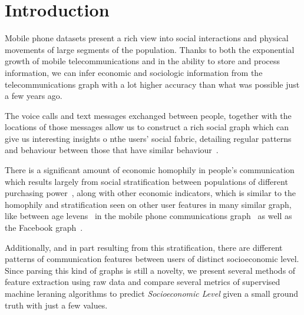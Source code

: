 \section{Introduction}

Mobile phone datasets present a rich view into social interactions and physical movements of large segments of the population. Thanks to both the exponential growth of mobile telecommunications and in the ability to store and process information, we can infer economic and sociologic information from the telecommunications graph with a lot higher accuracy than what was possible just a few years ago.

The voice calls and text messages exchanged between people, together with the locations of those messages allow us to construct a rich social graph which can give us interesting insights o nthe users' social fabric, detailing regular patterns and behaviour between those that have similar behaviour~\cite{gonzalez2008understanding, ponieman2013human, sarraute2015city}.

There is a significant amount of economic homophily in people's communication~\cite{fixmanasonam2016} which results largely from social stratification between populations of different purchasing power~\cite{leo2015socioeconomic}, along with other economic indicators, which is similar to the homophily and stratification seen on other user features in many similar graph, like between age levens~\cite{mcpherson2001birds} in the mobile phone communications graph~\cite{sarraute2014} as well as the Facebook graph~\cite{ugander2011anatomy}.

Additionally, and in part resulting from this stratification, there are different patterns of communication features between users of distinct socioeconomic level. Since parsing this kind of graphs is still a novelty, we present several methods of feature extraction using raw data and compare several metrics of supervised machine leraning algorithms to predict \emph{Socioeconomic Level} given a small ground truth with just a few values.
